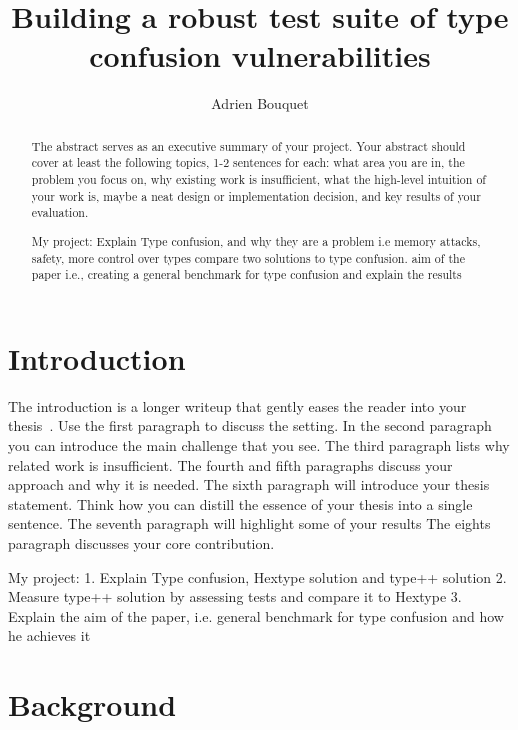 \documentclass[a4paper,11pt,oneside]{report}
\title{Building a robust test suite of type confusion vulnerabilities}
\author{Adrien Bouquet}
\begin{document}
\maketitle
\makededication
\makeacks

\begin{abstract}

The abstract serves as an executive summary of your project.
Your abstract should cover at least the following topics, 1-2 sentences for
each: what area you are in, the problem you focus on, why existing work is
insufficient, what the high-level intuition of your work is, maybe a neat
design or implementation decision, and key results of your evaluation.

My project: 
Explain Type confusion, and why they are a problem i.e memory attacks, safety, more control over types
compare two solutions to type confusion.
aim of the paper i.e., creating a general benchmark for type confusion and explain the results


\end{abstract}

\maketoc

\chapter{Introduction}

The introduction is a longer writeup that gently eases the reader into your
thesis~\cite{dinesh20oakland}. Use the first paragraph to discuss the setting.
In the second paragraph you can introduce the main challenge that you see.
The third paragraph lists why related work is insufficient.
The fourth and fifth paragraphs discuss your approach and why it is needed.
The sixth paragraph will introduce your thesis statement. Think how you can
distill the essence of your thesis into a single sentence.
The seventh paragraph will highlight some of your results
The eights paragraph discusses your core contribution.

My project: 
1. Explain Type confusion, Hextype solution and type++ solution
2. Measure type++ solution by assessing tests and compare it to Hextype
3. Explain the aim of the paper, i.e. general benchmark for type confusion and how he achieves it

\chapter{Background}
\end{document}
